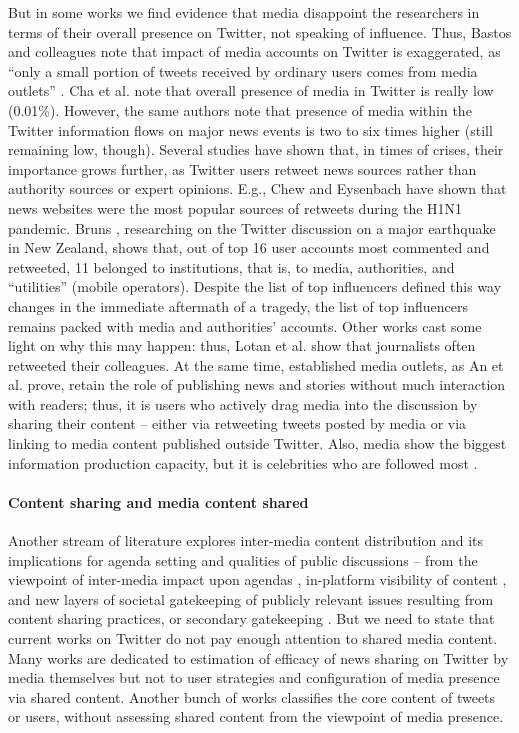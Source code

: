 But in some works we find evidence that media disappoint the researchers in terms of their overall presence on Twitter, not speaking of influence. Thus, Bastos and colleagues \cite{BastosRaimundoTravitzki} note that impact of media accounts on Twitter is exaggerated, as “only a small portion of tweets received by ordinary users comes from media outlets” \cite[p.~269]{BastosRaimundoTravitzki}. Cha et al. \cite{ChaHaddadiBenevenuto} note that overall presence of media in Twitter is really low (0.01\%). However, the same authors note that presence of media within the Twitter information flows on major news events is two to six times higher (still remaining low, though). Several studies have shown that, in times of crises, their importance grows further, as Twitter users retweet news sources rather than authority sources or expert opinions. E.g., Chew and Eysenbach \cite{ChewEysenbach} have shown that news websites were the most popular sources of retweets during the H1N1 pandemic. Bruns \cite{Bruns2014}, researching on the Twitter discussion on a major earthquake in New Zealand, shows that, out of top 16 user accounts most commented and retweeted, 11 belonged to institutions, that is, to media, authorities, and “utilities” (mobile operators). Despite the list of top influencers defined this way changes in the immediate aftermath of a tragedy, the list of top influencers remains packed with media and authorities’ accounts. Other works cast some light on why this may happen: thus, Lotan et al. \cite{LotanGraeffAnanny} show that journalists often retweeted their colleagues. At the same time, established media outlets, as An et al. \cite{AnChaGummadi} prove, retain the role of publishing news and stories without much interaction with readers; thus, it is users who actively drag media into the discussion by sharing their content -- either via retweeting tweets posted by media or via linking to media content published outside Twitter. Also, media show the biggest information production capacity, but it is celebrities who are followed most \cite{WuHofmanMason}.

\paragraph{Content sharing and media content shared}
Another stream of literature explores inter-media content distribution and its implications for agenda setting and qualities of public discussions -- from the viewpoint of inter-media impact upon agendas \cite{McCombs2004,HarringtonHighfieldBruns}, in-platform visibility of content \cite{Singer}, and new layers of societal gatekeeping of publicly relevant issues resulting from content sharing practices, or secondary gatekeeping \cite{Nielsen}. But we need to state that current works on Twitter do not pay enough attention to shared media content. Many works are dedicated to estimation of efficacy of news sharing on Twitter by media themselves but not to user strategies and configuration of media presence via shared content. Another bunch of works classifies the core content of tweets or users, without assessing shared content from the viewpoint of media presence.

